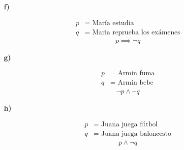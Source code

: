 \textbf{f)}
\vspace{-20px}
\begin{multicols}{2}
    \noindent
    \begin{align*}
        p &= \text{ María estudia}\\
        q &= \text{ Maria reprueba los exámenes}
    \end{align*}
    \columnbreak
    \begin{align*}
        p\implies \neg q
    \end{align*}
\end{multicols}
\textbf{g)}
\vspace{-20px}
\begin{multicols}{2}
    \noindent
    \begin{align*}
        p &= \text{ Armin fuma}\\
        q &= \text{ Armin bebe}
    \end{align*}
    \columnbreak
    \begin{align*}
        \neg p\land \neg q
    \end{align*}
\end{multicols}
\textbf{h)}
\vspace{-20px}
\begin{multicols}{2}
    \noindent
    \begin{align*}
        p &= \text{ Juana juega fútbol}\\
        q &= \text{ Juana juega baloncesto}
    \end{align*}
    \columnbreak
    \begin{align*}
        p\land \neg q
    \end{align*}
\end{multicols}

